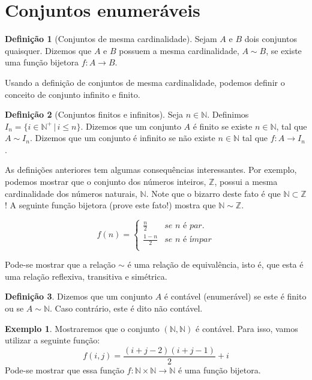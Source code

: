 \documentclass[a4paper]{article}
\theoremstyle{definition}
\newtheorem{Example}{Exemplo}
\newtheorem{Definition}{Definição}
\begin{document}
  
  
  \section{Conjuntos enumeráveis}

  \begin{Definition}[Conjuntos de mesma cardinalidade]
    Sejam $A$ e $B$ dois conjuntos quaisquer. Dizemos que $A$ e $B$ possuem
    a mesma cardinalidade, $A \sim B$, se existe uma função bijetora $f : A \to B$.
  \end{Definition}

  Usando a definição de conjuntos de mesma cardinalidade, podemos definir
  o conceito de conjunto infinito e finito.

  \begin{Definition}[Conjuntos finitos e infinitos]
    Seja $n \in \mathbb{N}$. Definimos $I_n =\{i \in \mathbb{N}^+\,|\, i \leq
    n\}$. Dizemos que um conjunto $A$ é finito se existe $n \in \mathbb{N}$, tal
    que $A \sim I_n$. Dizemos que um conjunto é infinito se não existe $n \in
    \mathbb{N}$ tal que $f : A \to I_n$.
  \end{Definition}

  As definições anteriores tem algumas consequências interessantes. Por exemplo,
  podemos mostrar que o conjunto dos números inteiros, $\mathbb{Z}$, possui a
  mesma cardinalidade dos números naturais, $\mathbb{N}$. Note que o bizarro
  deste fato é que $\mathbb{N} \subset \mathbb{Z}$! A seguinte função bijetora
  (prove este fato!) mostra que $\mathbb{N} \sim \mathbb{Z}$.

  \[
    f(n) = \left\{
      \begin{array}{ll}
        \frac{n}{2} & \textit{se }n\textit{ é par.}\\
        \frac{1 - n}{2} & \textit{se }n\textit{ é ímpar}\\
      \end{array}
           \right.
  \]

  Pode-se mostrar que a relação $\sim$ é uma relação de equivalência, isto é,
  que esta é uma relação reflexiva, transitiva e simétrica.

  \begin{Definition}
    Dizemos que um conjunto $A$ é contável (enumerável) se este é finito ou se $A
    \sim\mathbb{N}$. Caso contrário, este é dito não contável.
  \end{Definition}

  \begin{Example}
    Mostraremos que o conjunto $(\mathbb{N},\mathbb{N})$ é contável. Para isso,
    vamos utilizar a seguinte função:
    \[
      f(i,j) = \frac{(i + j - 2)(i + j - 1)}{2} + i
    \]
    Pode-se mostrar que essa função $f : \mathbb{N}\times\mathbb{N}\to
    \mathbb{N}$ é uma função bijetora.
  \end{Example}
\end{document}
